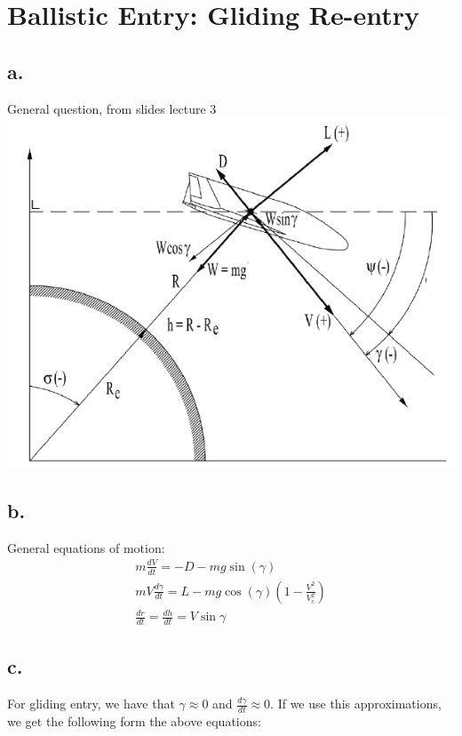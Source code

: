 \section{ Ballistic Entry: Gliding Re-entry }\label{sec:q2}   

\subsection*{a.}
General question, from slides lecture 3\\


\includegraphics[scale = 1]{Sketch.PNG}

\subsection*{b.}
General equations of motion:
\begin{equation}
    \begin{split}
        m \frac{dV}{dt} = -D - mg\sin{(\gamma)} \\
        m V \frac{d \gamma}{dt} = L - mg \cos{(\gamma)}(1-\frac{V^2}{V_c^2}) \\
        \frac{dr}{dt} = \frac{dh}{dt} = V\sin{\gamma}
    \end{split}
\end{equation}

\subsection*{c.}
For gliding entry, we have that $\gamma \approx 0$ and $\frac{d\gamma}{dt} \approx 0$. If we use this approximations, we get the following form the above equations:


